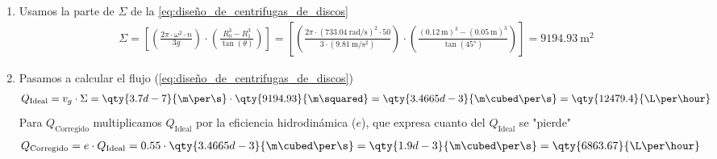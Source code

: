 {\begin{enumerate}
\begin{gather*}
            \end{gather*}
        \item Usamos la parte de $\Sigma$ de la \autoref{eq:diseño_de_centrifugas_de_discos} \begin{gather*}
            \Sigma=\left[\left(\frac{2\pi\cdot\omega^{2}\cdot n}{3g}\right)\cdot\left(\frac{R_{0}^{3}-R_{1}^{3}}{\tan(\theta)}\right)\right] = \left[ \left(\frac{2\pi\cdot(\qty{733.04}{\radian\per\s})^{2}\cdot 50}{3\cdot(\qty{9.81}{\m\per\s\squared})}\right)\cdot\left(\frac{(\qty{0.12}{\m})^{3} - (\qty{0.05}{\m})^{3}}{\tan(45°)} \right) \right] = \qty{9194.93}{\m\squared}
            \end{gather*}
        \item Pasamos a calcular el flujo (\autoref{eq:diseño_de_centrifugas_de_discos}) \begin{gather*}
            Q_{\text{Ideal}} = v_{g} \cdot \Sigma = \qty{3.7d-7}{\m\per\s} \cdot \qty{9194.93}{\m\squared} = \qty{3.4665d-3}{\m\cubed\per\s} = \qty{12479.4}{\L\per\hour}
            \end{gather*}
            Para $Q_{\text{Corregido}}$ multiplicamos $Q_{\text{Ideal}}$ por la eficiencia hidrodinámica ($e$), que expresa cuanto del $Q_{\text{Ideal}}$ se "pierde" \begin{gather*}
            Q_{\text{Corregido}} = e \cdot Q_{\text{Ideal}} = 0.55 \cdot \qty{3.4665d-3}{\m\cubed\per\s} = \qty{1.9d-3}{\m\cubed\per\s} = \qty{6863.67}{\L\per\hour}
            \end{gather*}
    \end{enumerate}
}

